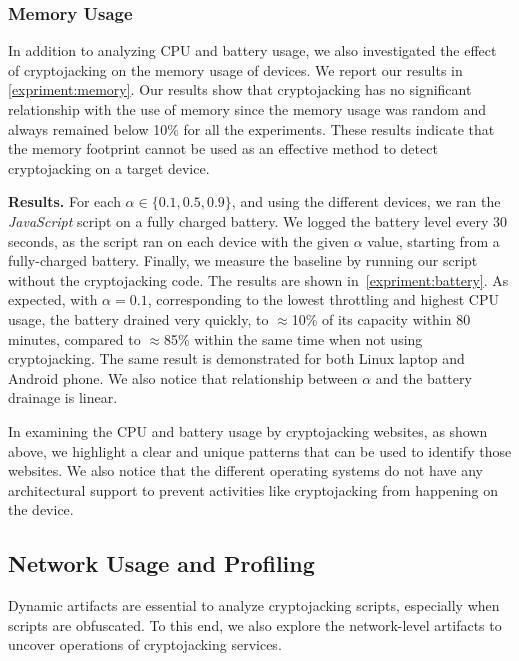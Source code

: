 \documentclass[acmlarge]{acmart}
\newcommand{\BfPara}[1]{{\noindent\bf#1.}\xspace\xspace}
\newcommand{\js}{{\em JavaScript}\xspace}
\newcommand{\cj}{cryptojacking\xspace}
\begin{document}
{\color{black}\subsubsection{Memory Usage} In addition to analyzing CPU and battery usage, we also investigated the effect of \cj on the memory usage of devices. We report our results in \autoref{expriment:memory}. Our results show that \cj has no significant relationship with the use of memory since the memory usage was random and always remained below 10\% for all the experiments. These results indicate that the memory footprint cannot be used as an effective method to detect \cj on a target device.}



\BfPara{Results} For each $\alpha\in \{0.1, 0.5, 0.9\}$, and using the different devices, we ran the \js script on a fully charged battery. We logged the battery level every 30 seconds, as the script ran on each device with the given $\alpha$ value, starting from a fully-charged battery. Finally, we measure the baseline by running our script without the \cj code. The results are shown in~\autoref{expriment:battery}. As expected, with $\alpha=0.1$, corresponding to the lowest throttling and highest CPU usage, the battery drained very quickly, to $\approx$10\% of its capacity within 80 minutes, compared to $\approx$85\% within the same time when not using \cj. The same result is demonstrated for both Linux laptop and Android phone. We also notice that relationship between $\alpha$ and the battery drainage is linear.



In examining the CPU and battery usage by \cj websites, as shown above, we highlight a clear and unique patterns that can be used to identify those websites. We also notice that the different operating systems do not have any architectural  support to prevent activities like \cj from happening on the device. %





\subsection{Network Usage and Profiling} \label{sec:throt}
Dynamic artifacts are essential to analyze \cj scripts, especially when scripts are obfuscated. To this end, we also explore the network-level artifacts to uncover operations of \cj services. 
\end{document}
